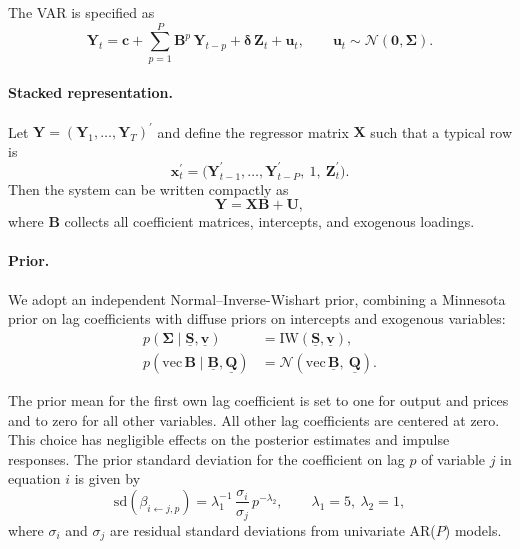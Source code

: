 \documentclass[12pt, reqno]{article}
\begin{document}
The VAR is specified as
\begin{equation}
\label{eq:A1_VAR}
\boldsymbol{Y}_t
=
\boldsymbol{c}
+ \sum_{p=1}^{P}
\boldsymbol{B}^{p}\,\boldsymbol{Y}_{t-p}
+ \boldsymbol{\delta}\,\boldsymbol{Z}_t
+ \boldsymbol{u}_t,
\qquad
\boldsymbol{u}_t \sim \mathcal{N}(\mathbf{0}, \boldsymbol{\Sigma}).
\end{equation}

\paragraph{Stacked representation.}
Let $\boldsymbol{Y} = (\boldsymbol{Y}_1,\dots,\boldsymbol{Y}_T)^\prime$ and define the regressor matrix $\boldsymbol{X}$ such that a typical row is
\[
\boldsymbol{x}_t^\prime =
\big(\boldsymbol{Y}_{t-1}^\prime,\ldots,\boldsymbol{Y}_{t-P}^\prime,\ 1,\ \boldsymbol{Z}_t^\prime\big).
\]
Then the system can be written compactly as
\[
\boldsymbol{Y} = \boldsymbol{X}\boldsymbol{B} + \boldsymbol{U},
\]
where $\boldsymbol{B}$ collects all coefficient matrices, intercepts, and exogenous loadings.

\paragraph{Prior.}
We adopt an independent Normal–Inverse-Wishart prior, combining a Minnesota prior on lag coefficients with diffuse priors on intercepts and exogenous variables:
\begin{align}
p(\boldsymbol{\Sigma}\mid \underline{\boldsymbol{S}},\underline{\boldsymbol{v}})
&= \mathrm{IW}(\underline{\boldsymbol{S}},\underline{\boldsymbol{v}}),\\
p\!\left(\mathrm{vec}\,\boldsymbol{B}\mid \underline{\boldsymbol{B}},\underline{\boldsymbol{Q}}\right)
&= \mathcal{N}\!\left(\mathrm{vec}\,\underline{\boldsymbol{B}},\ \underline{\boldsymbol{Q}}\right).
\end{align}

The prior mean for the first own lag coefficient is set to one for output and prices and to zero for all other variables. All other lag coefficients are centered at zero. This choice has negligible effects on the posterior estimates and impulse responses. The prior standard deviation for the coefficient on lag $p$ of variable $j$ in equation $i$ is given by
\[
\mathrm{sd}\!\left(\beta_{i\leftarrow j,p}\right)=\lambda_1^{-1}\,\frac{\sigma_i}{\sigma_j}\,p^{-\lambda_2},
\qquad \lambda_1=5,\ \lambda_2=1,
\]
where $\sigma_i$ and $\sigma_j$ are residual standard deviations from univariate AR($P$) models.
\end{document}
